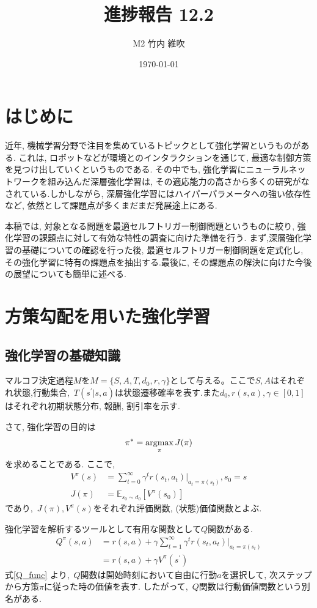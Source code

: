 \documentclass{jsarticle}
\title{\large{\bf{進捗報告 12.2}}}
\author{M2 竹内 維吹}
\date{\today}
\newcommand{\argmax}{\mathop{\rm argmax}\limits}
\newcommand{\expect}{\mathbb{E}}
\begin{document}
\maketitle


\section{はじめに}
近年, 機械学習分野で注目を集めているトピックとして強化学習というものがある. これは, ロボットなどが環境とのインタラクションを通じて, 最適な制御方策を見つけ出していくというものである. その中でも, 強化学習にニューラルネットワークを組み込んだ深層強化学習は, その適応能力の高さから多くの研究がなされている.しかしながら, 深層強化学習にはハイパーパラメータへの強い依存性など, 依然として課題点が多くまだまだ発展途上にある.\par
本稿では, 対象となる問題を最適セルフトリガー制御問題というものに絞り, 強化学習の課題点に対して有効な特性の調査に向けた準備を行う. まず,深層強化学習の基礎についての確認を行った後, 最適セルフトリガー制御問題を定式化し, その強化学習に特有の課題点を抽出する.最後に, その課題点の解決に向けた今後の展望についても簡単に述べる.

\section{方策勾配を用いた強化学習}
\subsection{強化学習の基礎知識}
マルコフ決定過程$M$を$M=\{S,A,T,d_0,r,\gamma\}$として与える。ここで$S,A$はそれぞれ状態,行動集合,~$T(s^{'}|s,a)$は状態遷移確率を表す.また$d_0,r(s,a),\gamma\in[0,1]$はそれぞれ初期状態分布, 報酬, 割引率を示す.\par
さて, 強化学習の目的は
\begin{equation}
	\pi^{*}=\argmax_{\pi}J(\pi) \label{purpose_of_rl}
\end{equation}を求めることである. ここで, 
\begin{align}
	V^{\pi}(s) &= \sum_{t=0}^{\infty}\gamma^tr(s_t, a_t)|_{a_t=\pi(s_t)}, s_0 = s\label{value_function}\\
	J(\pi) &= \expect_{s_0\sim d_0}[V^{\pi}(s_0)]
\end{align}
であり,~$J(\pi), V^{\pi}(s)$をそれぞれ評価関数, (状態)価値関数とよぶ.\par
強化学習を解析するツールとして有用な関数として$Q$関数がある.
\begin{align}
	Q^{\pi}(s,a) &= r(s, a) + \gamma\sum_{t=1}^{\infty}\gamma^tr(s_t, a_t)|_{a_t=\pi(s_t)} \nonumber\\
			    &= r(s, a) + \gamma V^{\pi}(s^{\prime}) \label{Q_func}
\end{align}
式\eqref{Q_func} より,~$Q$関数は開始時刻において自由に行動$a$を選択して, 次ステップから方策$\pi$に従った時の価値を表す. したがって,~$Q$関数は行動価値関数という別名がある.
\end{document}
